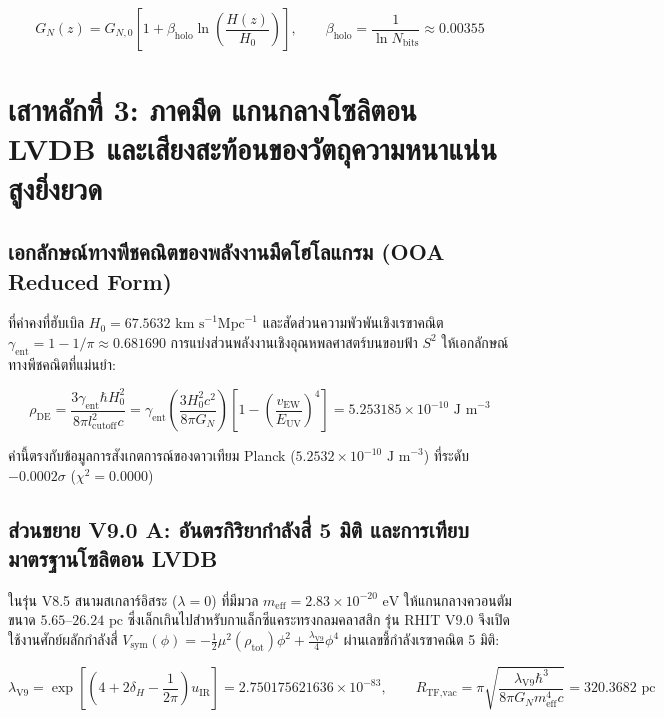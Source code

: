 \documentclass[11pt, a4paper]{article}
\begin{document}
\begin{equation}
G_N(z) = G_{N,0}\left[1 + \beta_{\text{holo}}\ln\left(\frac{H(z)}{H_0}\right)\right], \qquad \beta_{\text{holo}} = \frac{1}{\ln N_{\text{bits}}} \approx 0.00355
\end{equation}

\section{เสาหลักที่ 3: ภาคมืด แกนกลางโซลิตอน LVDB และเสียงสะท้อนของวัตถุความหนาแน่นสูงยิ่งยวด}

\subsection{เอกลักษณ์ทางพีชคณิตของพลังงานมืดโฮโลแกรม (OOA Reduced Form)}

ที่ค่าคงที่ฮับเบิล $H_0 = 67.5632\text{ km s}^{-1}\text{Mpc}^{-1}$ และสัดส่วนความพัวพันเชิงเรขาคณิต $\gamma_{\text{ent}} = 1 - 1/\pi \approx 0.681690$ การแบ่งส่วนพลังงานเชิงอุณหพลศาสตร์บนขอบฟ้า $S^2$ ให้เอกลักษณ์ทางพีชคณิตที่แม่นยำ:

\begin{equation}
\rho_{\text{DE}} = \frac{3\gamma_{\text{ent}} \hbar H_0^2}{8\pi l_{\text{cutoff}}^2 c} = \gamma_{\text{ent}} \left(\frac{3 H_0^2 c^2}{8\pi G_N}\right) \left[ 1 - \left(\frac{v_{\text{EW}}}{E_{\text{UV}}}\right)^4 \right] = 5.253185 \times 10^{-10}\text{ J m}^{-3}
\end{equation}

ค่านี้ตรงกับข้อมูลการสังเกตการณ์ของดาวเทียม Planck ($5.2532 \times 10^{-10}\text{ J m}^{-3}$) ที่ระดับ $-0.0002\sigma$ ($\chi^2 = 0.0000$)

\subsection{ส่วนขยาย V9.0 A: อันตรกิริยากำลังสี่ 5 มิติ และการเทียบมาตรฐานโซลิตอน LVDB}

ในรุ่น V8.5 สนามสเกลาร์อิสระ ($\lambda = 0$) ที่มีมวล $m_{\text{eff}} = 2.83 \times 10^{-20}\text{ eV}$ ให้แกนกลางควอนตัมขนาด $5.65\text{--}26.24\text{ pc}$ ซึ่งเล็กเกินไปสำหรับกาแล็กซีแคระทรงกลมคลาสสิก รุ่น RHIT V9.0 จึงเปิดใช้งานศักย์ผลักกำลังสี่ $V_{\text{sym}}(\phi) = -\frac{1}{2}\mu^2(\rho_{\text{tot}})\phi^2 + \frac{\lambda_{\text{V9}}}{4}\phi^4$ ผ่านเลขชี้กำลังเรขาคณิต 5 มิติ:

\begin{equation}
\lambda_{\text{V9}} = \exp\left[\left(4 + 2\delta_H - \frac{1}{2\pi}\right) u_{\text{IR}}\right] = 2.750175621636 \times 10^{-83}, \qquad
R_{\text{TF,vac}} = \pi \sqrt{\frac{\lambda_{\text{V9}} \hbar^3}{8\pi G_N m_{\text{eff}}^4 c}} = 320.3682\text{ pc}
\end{equation}
\end{document}
